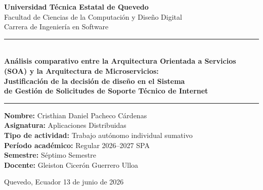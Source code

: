 \documentclass[12pt, a4paper]{article}
\begin{document}
\begin{titlepage}
\centering

\vspace*{0.5cm}

{\large\bfseries Universidad Técnica Estatal de Quevedo}\\[6pt]
{\normalsize Facultad de Ciencias de la Computación y Diseño Digital}\\[4pt]
{\normalsize Carrera de Ingeniería en Software}

\vspace{1cm}
\rule{\linewidth}{1pt}\\[10pt]

{\Large\bfseries
  Análisis comparativo entre la Arquitectura Orientada
  a Servicios (SOA) y la Arquitectura de Microservicios:\\[4pt]
  Justificación de la decisión de diseño en el Sistema\\[4pt]
  de Gestión de Solicitudes de Soporte Técnico de Internet
}

\vspace{2pt}
\rule{\linewidth}{1pt}

\vspace{1.2cm}

{\normalsize
\textbf{Nombre:} Cristhian Daniel Pacheco Cárdenas\\[4pt]
  \textbf{Asignatura:} Aplicaciones Distribuidas\\[4pt]
  \textbf{Tipo de actividad:} Trabajo autónomo individual sumativo\\[4pt]
  \textbf{Período académico:} Regular 2026--2027 SPA\\[4pt]
  \textbf{Semestre:} Séptimo Semestre\\[4pt]
  \textbf{Docente:} Gleiston Cicerón Guerrero Ulloa
}

\vspace{4.5cm}

{\small Quevedo, Ecuador \textperiodcentered{} 13 de junio de 2026}

\end{titlepage}


\pagestyle{fancy}
\end{document}

